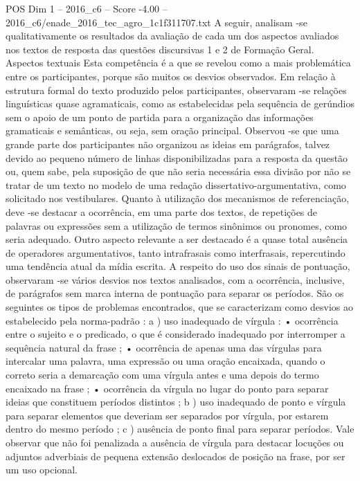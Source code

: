 \begin{textsample}{POS Dim 1 – 2016\_c6 – Score -4.00 – 2016\_c6/enade\_2016\_tec\_agro\_1c1f311707.txt}
A seguir, analisam -se qualitativamente os resultados da avaliação de cada um dos aspectos avaliados nos textos de resposta das questões discursivas 1 e 2 de Formação Geral.
Aspectos textuais Esta competência é a que se revelou como a mais problemática entre os participantes, porque são muitos os desvios observados.
Em relação à estrutura formal do texto produzido pelos participantes, observaram -se relações linguísticas quase agramaticais, como as estabelecidas pela sequência de gerúndios sem o apoio de um ponto de partida para a organização das informações gramaticais e semânticas, ou seja, sem oração principal.
Observou -se que uma grande parte dos participantes não organizou as ideias em parágrafos, talvez devido ao pequeno número de linhas disponibilizadas para a resposta da questão ou, quem sabe, pela suposição de que não seria necessária essa divisão por não se tratar de um texto no modelo de uma redação dissertativo-argumentativa, como solicitado nos vestibulares.
Quanto à utilização dos mecanismos de referenciação, deve -se destacar a ocorrência, em uma parte dos textos, de repetições de palavras ou expressões sem a utilização de termos sinônimos ou pronomes, como seria adequado.
Outro aspecto relevante a ser destacado é a quase total ausência de operadores argumentativos, tanto intrafrasais como interfrasais, repercutindo uma tendência atual da mídia escrita.
A respeito do uso dos sinais de pontuação, observaram -se vários desvios nos textos analisados, com a ocorrência, inclusive, de parágrafos sem marca interna de pontuação para separar os períodos.
São os seguintes os tipos de problemas encontrados, que se caracterizam como desvios ao estabelecido pela norma-padrão : a ) uso inadequado de vírgula : • ocorrência entre o sujeito e o predicado, o que é considerado inadequado por interromper a sequência natural da frase ; • ocorrência de apenas uma das vírgulas para intercalar uma palavra, uma expressão ou uma oração encaixada, quando o correto seria a demarcação com uma vírgula antes e uma depois do termo encaixado na frase ; • ocorrência da vírgula no lugar do ponto para separar ideias que constituem períodos distintos ; b ) uso inadequado de ponto e vírgula para separar elementos que deveriam ser separados por vírgula, por estarem dentro do mesmo período ; c ) ausência de ponto final para separar períodos.
Vale observar que não foi penalizada a ausência de vírgula para destacar locuções ou adjuntos adverbiais de pequena extensão deslocados de posição na frase, por ser um uso opcional.

\end{textsample}
